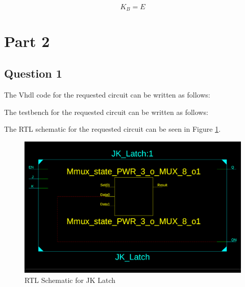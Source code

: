 \documentclass[table ]{article}
\begin{document}
\begin{equation}
    K_B = E
\end{equation}


\section*{Part 2}

\subsection*{Question 1}
The Vhdl code for the requested circuit can be written as follows:


\begin{center} %
    \lstset{
  caption= JK\_LATCH.vhd, 
  basicstyle=\footnotesize, frame=tb,
  xleftmargin=.2\textwidth, xrightmargin=.2\textwidth
}
    
\end{center}

The testbench for the requested circuit can be written as follows:


\begin{center} %
    \lstset{
  caption= JK\_LATCH\_tb.vhd, 
  basicstyle=\footnotesize, frame=tb,
  xleftmargin=.2\textwidth, xrightmargin=.2\textwidth
}
    
\end{center}



The RTL schematic for the requested circuit can be seen in Figure \ref{fig:jk_latch_rtl}.

\begin{figure}[H]
    \centering
    \includegraphics[width=\textwidth]{img/1/rtl.png}
    \caption{RTL Schematic for JK Latch}
    \label{fig:jk_latch_rtl}
\end{figure}
\end{document}
